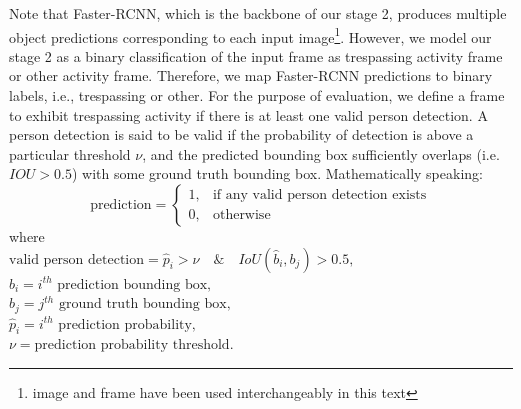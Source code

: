 Note that Faster-RCNN, which is the backbone of our stage 2, produces multiple object predictions corresponding to each input image\footnote{image and frame have been used interchangeably in this text}. However, we model our stage 2 as a binary classification of the input frame as trespassing activity frame or other activity frame. Therefore, we map Faster-RCNN predictions to binary labels, i.e., trespassing or other. For the purpose of evaluation, we define a frame to exhibit trespassing activity if there is at least one valid person detection. A person detection is said to be valid if the probability of detection is above a particular threshold $\nu$, and the predicted bounding box sufficiently overlaps (i.e. $IOU >0.5$) with some ground truth bounding box. Mathematically speaking:
$$
\text{prediction} = 
\begin{cases}
1, &    \text{if any valid person detection exists} \\
0, &    \text{otherwise}
\end{cases}
$$
where \\
$\text{valid person detection} = \hat{p}_i>\nu \quad \& \quad IoU(\hat{b}_i,b_j)>0.5,$ \\
$\hat{b}_i =i^{th} \text{ prediction bounding box,}$ \\
$b_j =j^{th} \text{ ground truth bounding box,}$ \\
$\hat{p}_i = i^{th} \text{ prediction probability,}$ \\
$\nu =  \text{prediction probability threshold.}$


